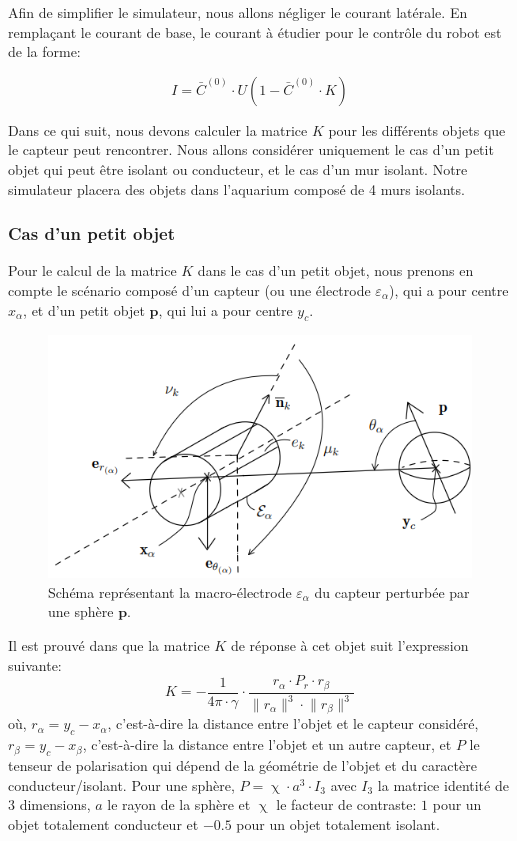 Afin de simplifier le simulateur, nous allons négliger le courant latérale. En remplaçant le courant de base, le courant à étudier pour le contrôle du robot est de la forme: 

\begin{equation}
    I= \bar{C}^{(0)} \cdot U \left ( 1- \bar{C}^{(0)} \cdot K \right )
\end{equation}

Dans ce qui suit, nous devons calculer la matrice $K$ pour les différents objets que le capteur peut rencontrer. Nous allons considérer uniquement le cas d'un petit objet qui peut être isolant ou conducteur, et le cas d'un mur isolant. Notre simulateur placera des objets dans l'aquarium composé de 4 murs isolants. 
\newpage
\subsubsection{Cas d'un petit objet}
Pour le calcul de la matrice $K$ dans le cas d'un petit objet, nous prenons en compte le scénario composé d'un capteur (ou une électrode $\varepsilon_{\alpha}$), qui a pour centre $x_\alpha$, et d'un petit objet $\mathbf{p}$, qui lui a pour centre $y_c$.
\begin{figure}[h!]
    \centering
    \includegraphics{doc/img/schema_petit_objet.png}
    \caption{Schéma représentant la macro-électrode $\varepsilon_{\alpha}$ du capteur perturbée par une sphère $\mathbf{p}$.}
    \label{fig:schema_petit_objet}
\end{figure}
Il est prouvé dans \cite{Boyer2012} que la matrice $K$ de réponse à cet objet suit l'expression suivante: 
\begin{equation}
    K = - \frac{1}{4\pi \cdot \gamma} \cdot \frac{r_\alpha \cdot P_r \cdot r_\beta}{\lVert r_\alpha \rVert^3 \cdot \lVert r_\beta \rVert^3}
\end{equation}
où, $r_\alpha = y_c - x_\alpha$, c'est-à-dire la distance entre l'objet et le capteur considéré, $r_\beta = y_c - x_\beta$, c'est-à-dire la distance entre l'objet et un autre capteur, et $P$ le tenseur de polarisation qui dépend de la géométrie de l'objet et du caractère conducteur/isolant. Pour une sphère, $P = \upchi \cdot a^3 \cdot I_{3}$ avec $I_3$ la matrice identité de $3$ dimensions, $a$ le rayon de la sphère et $\upchi$ le facteur de contraste: $1$ pour un objet totalement conducteur et $-0.5$ pour un objet totalement isolant.

